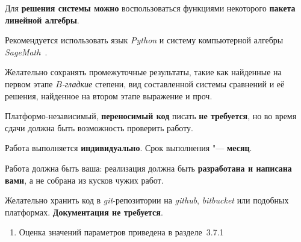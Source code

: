 \documentclass{ca-capstone}
\begin{document}
Для \textbf{решения системы можно} воспользоваться функциями некоторого \textbf{пакета
линейной алгебры}.

Рекомендуется использовать язык \emph{Python} и систему компьютерной алгебры
\emph{SageMath}~\cite{sagemath}.

Желательно сохранять промежуточные результаты, такие как найденные на первом этапе
\emph{$B$-гладкие} степени, вид составленной системы сравнений и её решения, найденное на
втором этапе выражение и проч.

Платформо-независимый, \textbf{переносимый код} писать \textbf{не требуется}, но во время сдачи
должна быть возможность проверить работу.

\schedule
Работа выполняется \textbf{индивидуально}. Срок выполнения "--- \textbf{месяц}.

Работа должна быть ваша: реализация должна быть \textbf{разработана и написана вами}, а не
собрана из кусков чужих работ.

Желательно хранить код в \emph{git}-репозитории на \emph{github}, \emph{bitbucket} или подобных
платформах. \textbf{Документация не требуется}.

\remarks
\begin{enumerate}
  \item Оценка значений параметров приведена в разделе~3.7.1~\cite{hps}
\end{enumerate}

\end{document}
